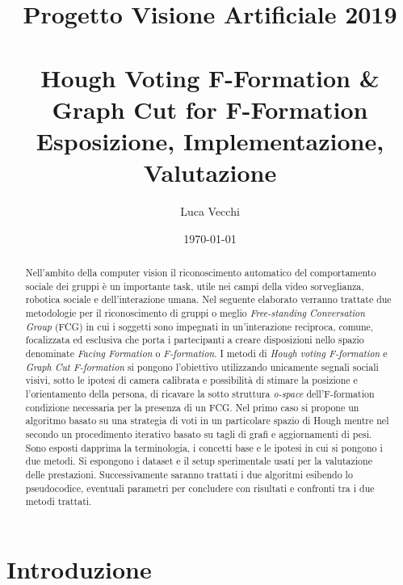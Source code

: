 \documentclass[8pt,twocolumn]{article}
\begin{document}
    \title{Progetto Visione Artificiale 2019\\\\
        Hough Voting F-Formation \& Graph Cut for F-Formation\\
        \medium Esposizione, Implementazione, Valutazione}
    \author{Luca Vecchi}
    \date{\today}
    \maketitle
    \begin{abstract}
    	Nell'ambito della computer vision il riconoscimento automatico del comportamento sociale dei gruppi è un importante task, utile nei campi della video sorveglianza, robotica sociale e dell'interazione umana. Nel seguente elaborato verranno trattate due metodologie per il riconoscimento di gruppi o meglio \textit{Free-standing Conversation Group} (FCG) in cui i soggetti sono impegnati in un'interazione reciproca, comune, focalizzata ed esclusiva che porta i partecipanti a creare disposizioni nello spazio denominate \textit{Facing Formation} o \textit{F-formation}. I metodi di \textit{Hough voting F-formation}\cite{Cristani:BMVC11} e \textit{Graph Cut F-formation}\cite{Setti:PLOS15} si pongono l'obiettivo utilizzando unicamente segnali sociali visivi, sotto le ipotesi di camera calibrata e possibilità di stimare la posizione e l'orientamento della persona, di ricavare la sotto struttura \textit{o-space} dell'F-formation condizione necessaria per la presenza di un FCG. Nel primo caso si propone un algoritmo basato su una strategia di voti in un particolare spazio di Hough mentre nel secondo un procedimento iterativo basato su tagli di grafi e aggiornamenti di pesi.\\
    	Sono esposti dapprima la terminologia, i concetti base e le ipotesi in cui si pongono i due metodi. Si espongono i dataset e il setup sperimentale usati per la valutazione delle prestazioni.
    	Successivamente saranno trattati i due algoritmi esibendo lo pseudocodice, eventuali parametri per concludere con risultati e confronti tra i due metodi trattati.
    \end{abstract}

	
	\section{Introduzione}
	
	
\end{document}
